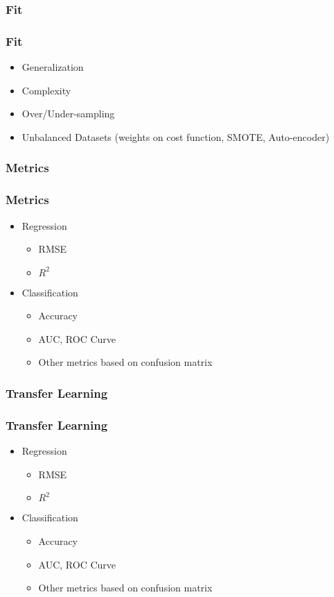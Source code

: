 \subsubsection{Fit}

\begin{frame}\frametitle{Fit}
   \begin{itemize}
      \item Generalization
      \item Complexity
      \item Over/Under-sampling
      \item Unbalanced Datasets (weights on cost function, SMOTE, Auto-encoder)
   \end{itemize}
\end{frame}


\subsubsection{Metrics}

\begin{frame}\frametitle{Metrics}
   \begin{itemize}
      \item Regression
      \begin{itemize}
         \item RMSE
         \item $R^2$
      \end{itemize}

      \item Classification
      \begin{itemize}
         \item Accuracy
         \item AUC, ROC Curve
         \item Other metrics based on confusion matrix
      \end{itemize}
   \end{itemize}
\end{frame}


\subsubsection{Transfer Learning}

\begin{frame}\frametitle{Transfer Learning}
   \begin{itemize}
      \item Regression
      \begin{itemize}
         \item RMSE
         \item $R^2$
      \end{itemize}

      \item Classification
      \begin{itemize}
         \item Accuracy
         \item AUC, ROC Curve
         \item Other metrics based on confusion matrix
      \end{itemize}
   \end{itemize}
\end{frame}



